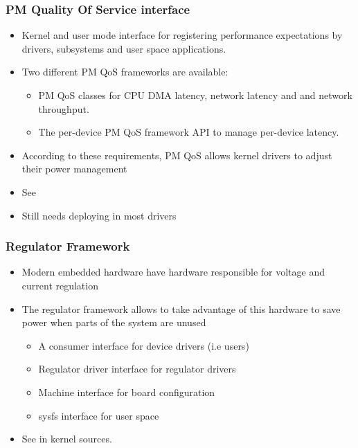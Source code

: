 \begin{frame}
  \frametitle{PM Quality Of Service interface}
  \begin{itemize}
  \item Kernel and user mode interface for registering
        performance expectations by drivers, subsystems and user space
        applications.
  \item Two different PM QoS frameworks are available:
    \begin{itemize}
       \item PM QoS classes for CPU DMA latency, network latency and
             and network throughput.
       \item The per-device PM QoS framework API to manage per-device
	     latency.
    \end{itemize}
  \item According to these requirements, PM QoS allows kernel drivers
        to adjust their power management
  \item See 
  \item Still needs deploying in most drivers
  \end{itemize}
\end{frame}

\begin{frame}
  \frametitle{Regulator Framework}
  \begin{itemize}
  \item Modern embedded hardware have hardware responsible for voltage
    and current regulation
  \item The regulator framework allows to take advantage of this
    hardware to save power when parts of the system are unused
    \begin{itemize}
    \item A consumer interface for device drivers (i.e users)
    \item Regulator driver interface for regulator drivers
    \item Machine interface for board configuration
    \item sysfs interface for user space
    \end{itemize}
  \item See  in kernel sources.
  \end{itemize}
\end{frame}

